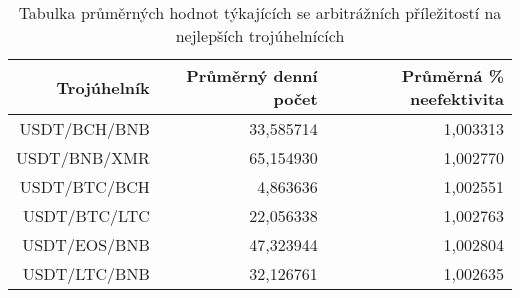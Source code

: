 \begin{table}\centering
\caption{Tabulka průměrných hodnot týkajících se arbitrážních příležitostí na nejlepších trojúhelnících}
\label{table_averages_best}
\begin{tabular}{|| r | r | r ||}\hline Trojúhelník & Průměrný denní počet & Průměrná \% neefektivita\\ [0.5ex]
 \hline\hline USDT/BCH/BNB & 33,585714 & 1,003313\\ 
 \hline USDT/BNB/XMR & 65,154930 & 1,002770\\ 
 \hline USDT/BTC/BCH & 4,863636 & 1,002551\\ 
 \hline USDT/BTC/LTC & 22,056338 & 1,002763\\ 
 \hline USDT/EOS/BNB & 47,323944 & 1,002804\\ 
 \hline USDT/LTC/BNB & 32,126761 & 1,002635\\ 
 \hline
\end{tabular}
\end{table}